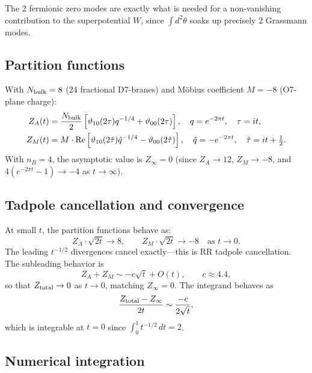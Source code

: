 \documentclass[11pt]{article}
\begin{document}
The 2 fermionic zero modes are exactly what is needed for a non-vanishing contribution to the superpotential $W$, since $\int d^2\theta$ soaks up precisely 2 Grassmann modes.

\subsection{Partition functions}

With $N_{\rm bulk} = 8$ (24 fractional D7-branes) and M\"obius coefficient $M = -8$ (O7-plane charge):
\begin{align}
Z_A(t) &= \frac{N_{\rm bulk}}{2}\left[ \vartheta_{10}(2\tau) q^{-1/4} + \vartheta_{00}(2\tau) \right], \quad q = e^{-2\pi t}, \quad \tau = it, \\
Z_M(t) &= M \cdot \text{Re}\left[\vartheta_{10}(2\hat\tau) \hat{q}^{-1/4} - \vartheta_{00}(2\hat\tau)\right], \quad \hat{q} = -e^{-2\pi t}, \quad \hat\tau = it + \tfrac{1}{2}.
\end{align}
With $n_B = 4$, the asymptotic value is $Z_\infty = 0$ (since $Z_A \to 12$, $Z_M \to -8$, and $4(e^{-2\pi t} - 1) \to -4$ as $t \to \infty$).

\subsection{Tadpole cancellation and convergence}

At small $t$, the partition functions behave as:
\begin{equation}
Z_A \cdot \sqrt{2t} \to 8, \qquad Z_M \cdot \sqrt{2t} \to -8 \quad \text{as } t \to 0.
\end{equation}
The leading $t^{-1/2}$ divergences cancel exactly---this is RR tadpole cancellation. The subleading behavior is
\begin{equation}
Z_A + Z_M \sim -c\sqrt{t} + O(t), \qquad c \approx 4.4,
\end{equation}
so that $Z_{\rm total} \to 0$ as $t \to 0$, matching $Z_\infty = 0$. The integrand behaves as
\begin{equation}
\frac{Z_{\rm total} - Z_\infty}{2t} \sim \frac{-c}{2\sqrt{t}},
\end{equation}
which is integrable at $t = 0$ since $\int_0^1 t^{-1/2}\, dt = 2$.

\subsection{Numerical integration}
\end{document}
